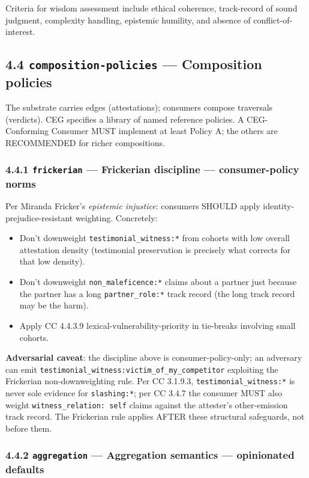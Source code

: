 \documentclass[11pt]{article}
\begin{document}
Criteria for wisdom assessment include ethical coherence, track-record of sound judgment, complexity handling, epistemic humility, and absence of conflict-of-interest.


\subsection*{4.4 \texttt{composition-policies} — Composition policies}


The substrate carries edges (attestations); consumers compose traversals (verdicts). CEG specifies a library of named reference policies. A CEG-Conforming Consumer MUST implement at least Policy A; the others are RECOMMENDED for richer compositions.


\subsubsection*{4.4.1 \texttt{frickerian} — Frickerian discipline — consumer-policy norms}


Per Miranda Fricker's \textit{epistemic injustice}: consumers SHOULD apply identity-prejudice-resistant weighting. Concretely:


\begin{itemize}\setlength\itemsep{0pt}
\item Don't downweight \texttt{testimonial\_witness:*} from cohorts with low overall attestation density (testimonial preservation is precisely what corrects for that low density).
\item Don't downweight \texttt{non\_maleficence:*} claims about a partner just because the partner has a long \texttt{partner\_role:*} track record (the long track record may be the harm).
\item Apply CC 4.4.3.9 lexical-vulnerability-priority in tie-breaks involving small cohorts.
\end{itemize}


\textbf{Adversarial caveat}: the discipline above is consumer-policy-only; an adversary can emit \texttt{testimonial\_witness:victim\_of\_my\_competitor} exploiting the Frickerian non-downweighting rule. Per CC 3.1.9.3, \texttt{testimonial\_witness:*} is never sole evidence for \texttt{slashing:*}; per CC 3.4.7 the consumer MUST also weight \texttt{witness\_relation: self} claims against the attester's other-emission track record. The Frickerian rule applies AFTER these structural safeguards, not before them.


\subsubsection*{4.4.2 \texttt{aggregation} — Aggregation semantics — opinionated defaults}
\end{document}
